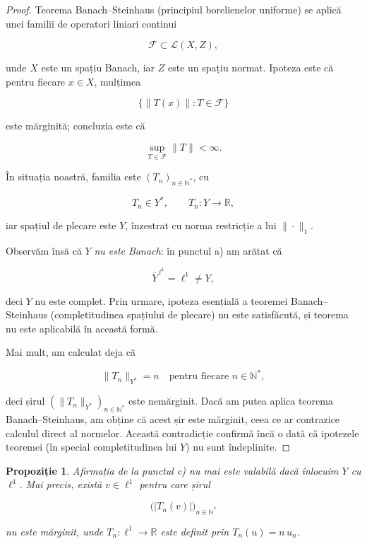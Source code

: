 \documentclass[12pt]{article}
\theoremstyle{definition}
\theoremstyle{plain}
\newtheorem{proposition}{Propoziție}
\begin{document}
\begin{proof}
Teorema Banach--Steinhaus (principiul borelienelor uniforme) se aplică unei familii de operatori liniari continui


\[
\mathcal{F} \subset \mathcal{L}(X,Z),
\]


unde $X$ este un spațiu Banach, iar $Z$ este un spațiu normat. Ipoteza este că pentru fiecare $x \in X$, mulțimea


\[
\{ \|T(x)\| : T \in \mathcal{F} \}
\]


este mărginită; concluzia este că


\[
\sup_{T \in \mathcal{F}} \|T\| < \infty.
\]



În situația noastră, familia este $(T_n)_{n\in\mathbb{N}^\ast}$, cu


\[
T_n \in Y^*, \qquad T_n : Y \to \mathbb{R},
\]


iar spațiul de plecare este $Y$, înzestrat cu norma restricție a lui $\|\cdot\|_1$.

Observăm însă că $Y$ \emph{nu este Banach}: în punctul a) am arătat că


\[
\overline{Y}^{\,\ell^1} = \ell^1 \neq Y,
\]


deci $Y$ nu este complet. Prin urmare, ipoteza esențială a teoremei Banach--Steinhaus (completitudinea spațiului de plecare) nu este satisfăcută, și teorema nu este aplicabilă în această formă.

Mai mult, am calculat deja că


\[
\|T_n\|_{Y^*} = n \quad \text{pentru fiecare } n \in \mathbb{N}^\ast,
\]


deci șirul $(\|T_n\|_{Y^*})_{n\in\mathbb{N}^\ast}$ este nemărginit. Dacă am putea aplica teorema Banach--Steinhaus, am obține că acest șir este mărginit, ceea ce ar contrazice calculul direct al normelor. Această contradicție confirmă încă o dată că ipotezele teoremei (în special completitudinea lui $Y$) nu sunt îndeplinite.
\end{proof}

\begin{proposition}
Afirmația de la punctul c) nu mai este valabilă dacă înlocuim $Y$ cu $\ell^1$. Mai precis, există $v \in \ell^1$ pentru care șirul


\[
\bigl(|T_n(v)|\bigr)_{n\in\mathbb{N}^\ast}
\]


nu este mărginit, unde $T_n : \ell^1 \to \mathbb{R}$ este definit prin $T_n(u) = n\,u_n$.
\end{proposition}
\end{document}
